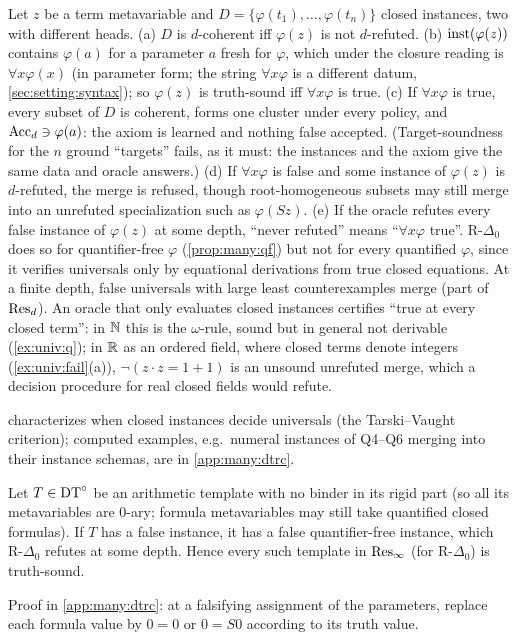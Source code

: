 \begin{proposition}\label{prop:many:forall}
Let $z$ be a term metavariable and $D=\{\varphi(t_1),\dots,\varphi(t_n)\}$ closed instances, two with different heads.
(a) $D$ is $d$-coherent iff $\varphi(z)$ is not $d$-refuted. (b) $\mathrm{inst}(\varphi(z))$ contains $\varphi(a)$ for a
parameter $a$ fresh for $\varphi$, which under the closure reading is $\forall x\varphi(x)$ (in parameter form; the string
$\forall x\varphi$ is a different datum, \cref{sec:setting:syntax}); so $\varphi(z)$ is truth-sound iff $\forall x\varphi$
is true. (c) If $\forall x\varphi$ is true, every subset of $D$ is coherent, \DTRC{} forms one cluster under every policy,
and $\mathrm{Acc}_d\ni\varphi(a)$: the axiom is learned and nothing false accepted. (Target-soundness for the $n$ ground
``targets'' fails, as it must: the instances and the axiom give the same data and oracle answers.) (d) If $\forall
x\varphi$ is false and some instance of $\varphi(z)$ is $d$-refuted, the merge is refused, though root-homogeneous subsets
may still merge into an unrefuted specialization such as $\varphi(Sz)$. (e) If the oracle refutes every false instance of
$\varphi(z)$ at some depth, ``never refuted'' means ``$\forall x\varphi$ true''. R-$\Delta_0$ does so for quantifier-free
$\varphi$ (\cref{prop:many:qf}) but not for every quantified $\varphi$, since it verifies universals only by equational
derivations from true closed equations. At a finite depth, false universals with large least counterexamples merge (part
of $\mathrm{Res}_d$). An oracle that only evaluates closed instances certifies ``true at every closed term'': in $\mathbb{N}$ this is the
$\omega$-rule, sound but in general not derivable (\cref{ex:univ:q}); in $\mathbb{R}$ as an ordered field, where closed terms denote integers
(\cref{ex:univ:fail}(a)), $\neg(z\cdot z=1+1)$ is an unsound unrefuted merge, which a decision procedure for real closed
fields would refute.
\end{proposition}

 characterizes when closed instances decide universals (the Tarski--Vaught criterion); computed
examples, e.g.\ numeral instances of Q4--Q6 merging into their instance schemas, are in \cref{app:many:dtrc}.

\begin{proposition}\label{prop:many:qf}
Let $T\in\mathrm{DT}^{\circ}$ be an arithmetic template with no binder in its rigid part (so all its metavariables are 0-ary; formula
metavariables may still take quantified closed formulas). If $T$ has a false instance, it has a false quantifier-free
instance, which R-$\Delta_0$ refutes at some depth. Hence every such template in $\mathrm{Res}_\infty$ (for R-$\Delta_0$) is
truth-sound.
\end{proposition}
\noindent Proof in \cref{app:many:dtrc}: at a falsifying assignment of the parameters, replace each formula value by
$0=0$ or $0=S0$ according to its truth value.\medskip

